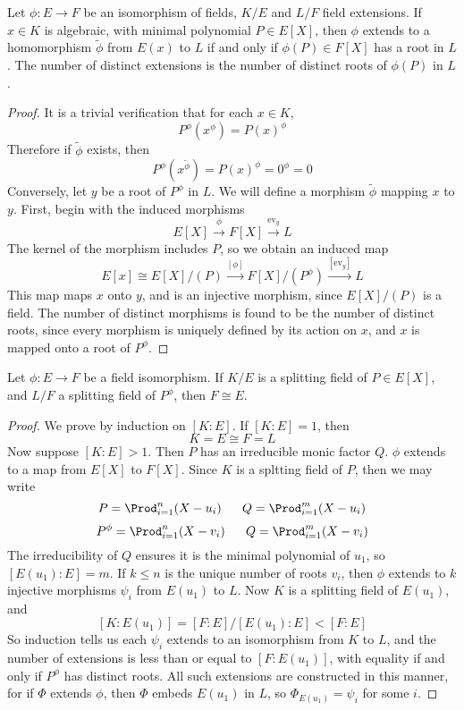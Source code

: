 \begin{lemma}
    Let $\phi: E \to F$ be an isomorphism of fields, $K/E$ and $L/F$ field extensions. If $x \in K$ is algebraic, with minimal polynomial $P \in E[X]$, then $\phi$ extends to a homomorphism $\tilde{\phi}$ from $E(x)$ to $L$ if and only if $\phi(P) \in F[X]$ has a root in $L$. The number of distinct extensions is the number of distinct roots of $\phi(P)$ in $L$.
\end{lemma}
\begin{proof}
    It is a trivial verification that for each $x \in K$,
    \[ P^\phi(x^\phi) = P(x)^\phi \]
    Therefore if $\tilde{\phi}$ exists, then
    \[ P^\phi (x^{\tilde{\phi}}) = P(x)^\phi = 0^\phi = 0 \]
    Conversely, let $y$ be a root of $P^\phi$ in $L$. We will define a morphism $\tilde{\phi}$ mapping $x$ to $y$. First, begin with the induced morphisms
    \[ E[X] \xrightarrow{\phi} F[X] \xrightarrow{\text{ev}_y} L \]
    The kernel of the morphism includes $P$, so we obtain an induced map
    \[ E[x] \cong E[X]/(P) \xrightarrow{[\phi]} F[X]/(P^\phi) \xrightarrow{[\text{ev}_y]} L \]
    This map maps $x$ onto $y$, and is an injective morphism, since $E[X]/(P)$ is a field. The number of distinct morphisms is found to be the number of distinct roots, since every morphism is uniquely defined by its action on $x$, and $x$ is mapped onto a root of $P^\phi$.
\end{proof}

\begin{theorem}
    Let $\phi: E \to F$ be a field isomorphism. If $K/E$ is a splitting field of $P \in E[X]$, and $L/F$ a splitting field of $P^\phi$, then $F \cong E$.
\end{theorem}
\begin{proof}
    We prove by induction on $[K:E]$. If $[K:E] = 1$, then
    \[ K = E \cong F = L \]
    Now suppose $[K:E] > 1$. Then $P$ has an irreducible monic factor $Q$. $\phi$ extends to a map from $E[X]$ to $F[X]$. Since $K$ is a spltting field of $P$, then we may write
    \[ P = \Prod_{i = 1}^n (X - u_i)\ \ \ \ \ Q = \Prod_{i = 1}^m (X - u_i) \]
    \[ P^\phi = \Prod_{i = 1}^n (X - v_i)\ \ \ \ \ Q = \Prod_{i = 1}^m (X - v_i) \]
    The irreducibility of $Q$ ensures it is the minimal polynomial of $u_1$, so $[E(u_1): E] = m$. If $k \leq n$ is the unique number of roots $v_i$, then $\phi$ extends to $k$ injective morphisms $\psi_i$ from $E(u_1)$ to $L$. Now $K$ is a splitting field of $E(u_1)$, and
    \[ [K:E(u_1)] = [F:E]/[E(u_1):E] < [F:E] \]
    So induction tells us each $\psi_i$ extends to an isomorphism from $K$ to $L$, and the number of extensions is less than or equal to $[F:E(u_1)]$, with equality if and only if $P^\phi$ has distinct roots. All such extensions are constructed in this manner, for if $\Phi$ extends $\phi$, then $\Phi$ embeds $E(u_1)$ in $L$, so $\Phi_{E(u_1)} = \psi_i$ for some $i$.
\end{proof}

